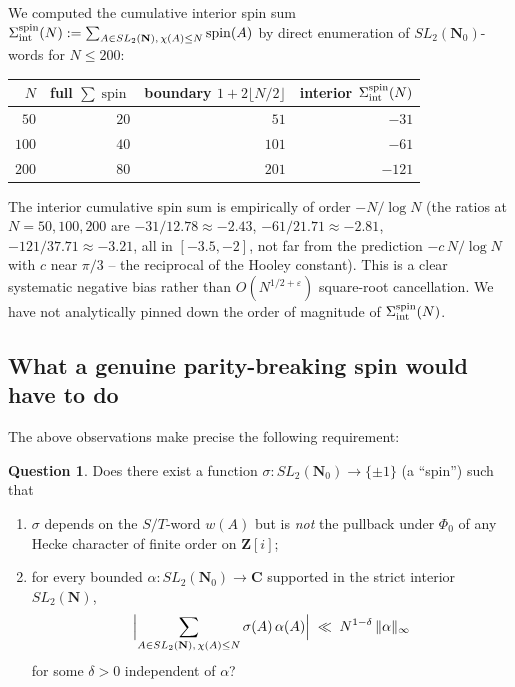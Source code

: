 \documentclass[11pt]{article}
\theoremstyle{definition}
\newtheorem{question}[theorem]{Question}
\newcommand{\N}{\mathbf{N}}
\newcommand{\Nz}{\mathbf{N}_0}
\newcommand{\Z}{\mathbf{Z}}
\newcommand{\C}{\mathbf{C}}
\newcommand{\SLNz}{SL_2(\Nz)}
\newcommand{\SLN}{SL_2(\N)}
\DeclareMathOperator{\spin}{spin}
\begin{document}
We computed the cumulative interior spin sum
$\Sigma_{\textnormal{int}}^{\spin}(N)
:=\sum_{A\in\SLN,\,\chi(A)\le N}\spin(A)$
by direct enumeration of $\SLNz$-words for $N\le 200$:
\begin{center}
\begin{tabular}{r|rrr}
$N$ & full $\sum\spin$ & boundary $1+2\lfloor N/2\rfloor$ &
interior $\Sigma_{\textnormal{int}}^{\spin}(N)$ \\\hline
$50$ & $20$ & $51$ & $-31$\\
$100$ & $40$ & $101$ & $-61$\\
$200$ & $80$ & $201$ & $-121$\\
\end{tabular}
\end{center}
The interior cumulative spin sum is empirically of order $-N/\log N$ (the
ratios at $N=50,100,200$ are $-31/12.78\approx-2.43$,
$-61/21.71\approx-2.81$, $-121/37.71\approx-3.21$, all in $[-3.5,-2]$,
not far from the prediction $-c\,N/\log N$ with $c$ near $\pi/3$ -- the
reciprocal of the Hooley constant). This is a clear systematic negative
bias rather than $O(N^{1/2+\varepsilon})$ square-root cancellation. We
have not analytically pinned down the order of magnitude of
$\Sigma_{\textnormal{int}}^{\spin}(N)$.

\subsection{What a genuine parity-breaking spin would have to do}

The above observations make precise the following requirement:

\begin{question}\label{q:genuine-spin}
Does there exist a function $\sigma:\SLNz\to\{\pm 1\}$ (a ``spin'') such
that
\begin{enumerate}
\item[\textnormal{(S1)}] $\sigma$ depends on the $S/T$-word $w(A)$ but
is \emph{not} the pullback under $\Phi_{0}$ of any Hecke character of
finite order on $\Z[i]$;
\item[\textnormal{(S2)}] for every bounded
$\alpha:\SLNz\to\C$ supported in the strict interior $\SLN$,
\[
\Bigl|\sum_{A\in\SLN,\,\chi(A)\le N}\sigma(A)\,\alpha(A)\Bigr|
\;\ll\;N^{1-\delta}\,\|\alpha\|_{\infty}
\]
for some $\delta>0$ independent of $\alpha$?
\end{enumerate}
\end{question}
\end{document}
